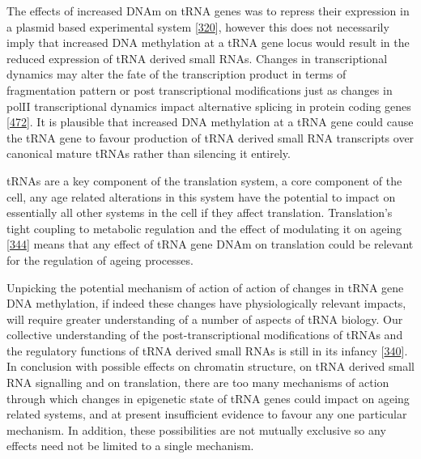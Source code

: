 \documentclass[
]{book}
\begin{document}
The effects of increased DNAm on tRNA genes was to repress their expression in a plasmid based experimental system {[}\protect\hyperlink{ref-Besser1990}{320}{]}, however this does not necessarily imply that increased DNA methylation at a tRNA gene locus would result in the reduced expression of tRNA derived small RNAs.
Changes in transcriptional dynamics may alter the fate of the transcription product in terms of fragmentation pattern or post transcriptional modifications just as changes in polII transcriptional dynamics impact alternative splicing in protein coding genes {[}\protect\hyperlink{ref-Tellier2020}{472}{]}.
It is plausible that increased DNA methylation at a tRNA gene could cause the tRNA gene to favour production of tRNA derived small RNA transcripts over canonical mature tRNAs rather than silencing it entirely.

tRNAs are a key component of the translation system, a core component of the cell, any age related alterations in this system have the potential to impact on essentially all other systems in the cell if they affect translation.
Translation's tight coupling to metabolic regulation and the effect of modulating it on ageing {[}\protect\hyperlink{ref-Hansen2007}{344}{]} means that any effect of tRNA gene DNAm on translation could be relevant for the regulation of ageing processes.

Unpicking the potential mechanism of action of action of changes in tRNA gene DNA methylation, if indeed these changes have physiologically relevant impacts, will require greater understanding of a number of aspects of tRNA biology.
Our collective understanding of the post-transcriptional modifications of tRNAs and the regulatory functions of tRNA derived small RNAs is still in its infancy {[}\protect\hyperlink{ref-Schimmel2017}{340}{]}.
In conclusion with possible effects on chromatin structure, on tRNA derived small RNA signalling and on translation, there are too many mechanisms of action through which changes in epigenetic state of tRNA genes could impact on ageing related systems, and at present insufficient evidence to favour any one particular mechanism.
In addition, these possibilities are not mutually exclusive so any effects need not be limited to a single mechanism.
\end{document}
